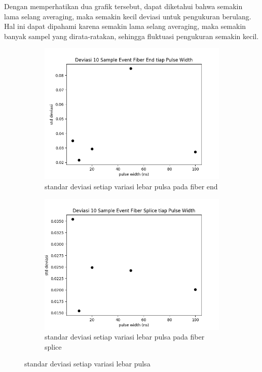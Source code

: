 \documentclass[12pt]{article}
\begin{document}
	Dengan memperhatikan dua grafik tersebut, dapat diketahui bahwa semakin lama selang averaging, maka semakin kecil deviasi untuk pengukuran berulang.
	Hal ini dapat dipahami karena semakin lama selang averaging, maka semakin banyak sampel yang dirata-ratakan, sehingga fluktuasi pengukuran semakin kecil.

	\begin{figure}[!h]
		\centering
		\captionsetup{justification=centering}
		\begin{subfigure}[b]{0.7\textwidth}
			\includegraphics[width=\textwidth]{images/Bab_4/stddev_pw_end}	
			\caption{\small{standar deviasi setiap variasi lebar pulsa pada fiber end}}		
		\end{subfigure}
		\begin{subfigure}[h]{0.7\textwidth}
			\includegraphics[width=\linewidth]{images/Bab_4/stddev_pw_splice}
			\caption{\small{standar deviasi setiap variasi lebar pulsa pada fiber splice}}			
		\end{subfigure}
		\caption[belum ada judul]{\small{standar deviasi setiap variasi lebar pulsa}}
	\end{figure}
\end{document}
